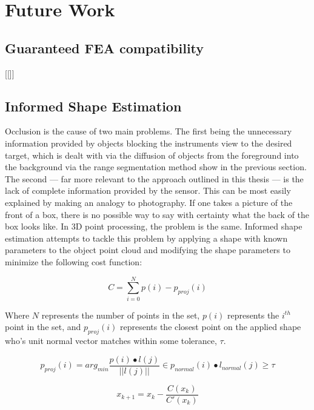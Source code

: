 \documentclass[12pt]{drexelthesis}
\let\Oldsection\section
\renewcommand{\section}{\FloatBarrier\Oldsection}
\begin{document}
\chapter{Future Work}
\label{chap:future}

\section{Guaranteed FEA compatibility}
[[]]

\section{Informed Shape Estimation}
\label{subsubsec:informedshape}
Occlusion is the cause of two main problems. The first being the unnecessary information provided by objects blocking the instruments view to the desired target, which is dealt with via the diffusion of objects from the foreground into the background via the range segmentation method show in the previous section. The second --- far more relevant to the approach outlined in this thesis --- is the lack of complete information provided by the sensor. This can be most easily explained by making an analogy to photography. If one takes a picture of the front of a box, there is no possible way to say with certainty what the back of the box looks like. In 3D point processing, the problem is the same. Informed shape estimation attempts to tackle this problem by applying a shape with known parameters to the object point cloud and modifying the shape parameters to minimize the following cost function:

\begin{equation}
	C = \sum_{i=0}^{N}{p(i) - p_{proj}(i)}
\end{equation}

Where $N$ represents the number of points in the set, $p(i)$ represents the $i^{th}$ point in the set, and $p_{proj}(i)$ represents the closest point on the applied shape who's unit normal vector matches within some tolerance, $\tau$.

\begin{equation}
	p_{proj}(i) = arg_{min} \frac{p(i) \bullet l(j)}{||l(j)||} \in p_{normal}(i) \bullet l_{normal}(j) \geq \tau
\end{equation}

\begin{equation}
	\label{eq:newtonraph}
	x_{k+1} = x_{k} - \frac{C(x_{k})}{C'(x_{k})}
\end{equation}
\end{document}
